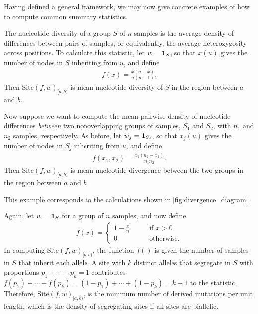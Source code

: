 \documentclass{article}
\newcommand{\site}{\mbox{Site}} %
\newcommand{\iw}{w} %
\newcommand{\nw}{x} %
\begin{document}
Having defined a general framework, we may now give concrete examples
of how to compute common summary statistics.

\begin{example} \label{ex:site_diversity}
    The nucleotide diversity of a group $S$ of $n$ samples
    is the average density of differences between pairs of samples,
    or equivalently, the average heterozygosity across positions.
    To calculate this statistic,
    let $\iw = \bone_S$,
    so that $\nw(u)$ gives the number of nodes in $S$ inheriting from $u$,
    and define
    \begin{align*}
        f(x) = \frac{x (n - x)}{n (n-1)} .
    \end{align*}
    Then $\site(f, \iw)_{[a,b)}$ is mean nucleotide diversity of $S$ in the region between $a$ and $b$.
\end{example}

\begin{example} \label{ex:site_divergence}
    Now suppose we want to compute the mean pairwise density of nucleotide differences
    \emph{between} two nonoverlapping groups of samples, $S_1$ and $S_2$,
    with $n_1$ and $n_2$ samples, respectively.
    As before,
    let $\iw_j = \bone_{S_j}$,
    so that $\nw_{j}(u)$ gives the number of nodes in $S_j$ inheriting from $u$,
    and define
    \begin{align*}
        f(x_1, x_2) = \frac{x_1 (n_2 - x_2)}{n_1 n_2} .
    \end{align*}
    Then $\site(f, \iw)_{[a,b)}$ is mean nucleotide divergence between the two groups
    in the region between $a$ and $b$.
\end{example}

This example corresponds to the calculations shown in \autoref{fig:divergence_diagram}.

\begin{example} \label{ex:segregating_sites}
    Again, let $\iw = \bone_{S}$ for a group of $n$ samples,
    and now define
    \begin{align*}
        f(x) = \begin{cases}
            1 - \frac{x}{n} \qquad &\text{if } x > 0 \\
            0 \qquad &\text{otherwise} .
        \end{cases}
    \end{align*}
    In computing $\site(f, \iw)_{[a,b)}$, the function $f()$ is given the number of samples in $S$
    that inherit each allele.
    A site with $k$ distinct alleles that segregate in $S$ with proportions $p_1 + \cdots + p_k = 1$
    contributes $f(p_1) + \cdots + f(p_k) = (1 - p_1) + \cdots + (1 - p_k) = k - 1$ to the statistic.
    Therefore, $\site(f, \iw)_{[a,b)}$, is the minimum number of derived mutations per unit length,
    which is the density of segregating sites if all sites are biallelic.
\end{example}
\end{document}
